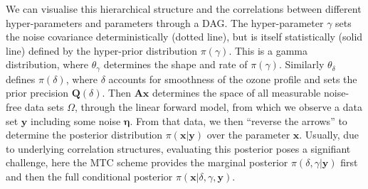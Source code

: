 We can visualise this hierarchical structure and the correlations between different hyper-parameters and parameters through a DAG.
The hyper-parameter $\gamma$ sets the noise covariance deterministically (dotted line), but is itself statistically (solid line) defined by the hyper-prior distribution $\pi(\gamma)$.
This is a gamma distribution, where $\theta_{\gamma}$ determines the shape and rate of $\pi(\gamma)$.
Similarly $\theta_{\delta}$ defines $\pi(\delta)$, where $\delta$ accounts for smoothness of the ozone profile and sets the prior precision $\bm{Q}(\delta)$.
Then $\bm{A}\bm{x}$ determines the space of all measurable noise-free data sets $\Omega$, through the linear forward model, from which we observe a data set $\bm{y}$ including some noise $\bm{\eta}$.
From that data, we then ``reverse the arrows'' to determine the posterior distribution $\pi(\bm{x}|\bm{y})$ over the parameter $\bm{x}$.
Usually, due to underlying correlation structures, evaluating this posterior poses a signifiant challenge, here the MTC scheme provides the marginal posterior $\pi(\delta, \gamma | \bm{y})$ first and then the full conditional posterior $\pi(\bm{x}|\delta, \gamma,\bm{y})$.

